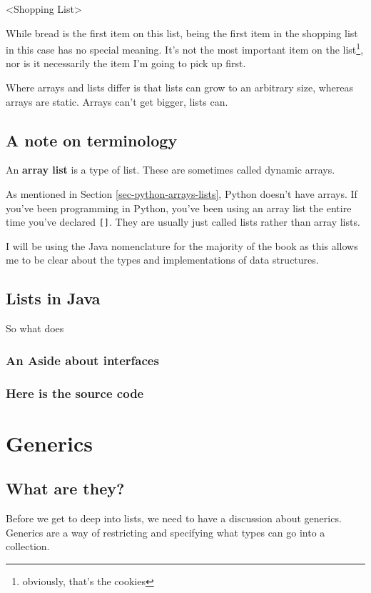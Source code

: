 <Shopping List>

While bread is the first item on this list, being the first item in the shopping list in this case has no special meaning.  It's not the most important item on the list\footnote{obviously, that's the cookies}, nor is it necessarily the item I'm going to pick up first.

Where arrays and lists differ is that lists can grow to an arbitrary size, whereas arrays are static.  Arrays can't get bigger, lists can.

\subsection*{A note on terminology}
An \textbf{array list} is a type of list.  These are sometimes called dynamic arrays.

As mentioned in Section \ref{sec-python-arrays-lists}, Python doesn't have arrays.  If you've been programming in Python, you've been using an array list the entire time you've declared \texttt{[]}.  They are usually just called lists rather than array lists.


I will be using the Java nomenclature for the majority of the book as this allows me to be clear about the types and implementations of data structures.

\subsection{Lists in Java}

So what does

\subsubsection{An Aside about interfaces}
\subsubsection*{Here is the source code}



\section{Generics}

\subsection{What are they?}


Before we get to deep into lists, we need to have a discussion about generics. Generics are a way of restricting and specifying what types can go into a collection.

